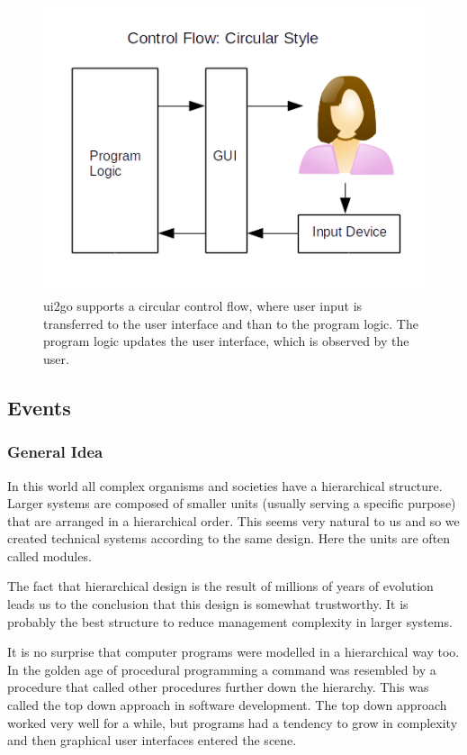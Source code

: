 \begin{figure}[ht]
\centering
\includegraphics[width=12cm]{img/controlflowcircular.png}
\caption{ui2go supports a circular control flow, where user input
is transferred to the user interface and than to the program logic.
The program logic updates the user interface, which is observed by
the user.}
\end{figure}


\subsection{Events}

\subsubsection{General Idea}

In this world all complex organisms and societies have a hierarchical
structure. Larger systems are composed of smaller units (usually serving
a specific purpose) that are arranged in a hierarchical order. This
seems very natural to us and so we created technical systems according
to the same design. Here the units are often called modules.

The fact that hierarchical design is the result of millions of years of
evolution leads us to the conclusion that this design is somewhat
trustworthy. It is probably the best structure to reduce management
complexity in larger systems.

It is no surprise that computer programs were modelled in a hierarchical
way too. In the golden age of procedural programming a command was
resembled by a procedure that called other procedures further down the
hierarchy. This was called the top down approach in software
development. The top down approach worked very well for a while, but
programs had a tendency to grow in complexity and then graphical user
interfaces entered the scene.

